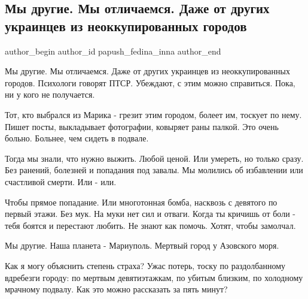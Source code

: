  
 
 
 
 
 
\subsection{Мы другие. Мы отличаемся. Даже от других украинцев из неоккупированных городов}
\label{sec:24_05_2022.fb.papush_fedina_inna.1.my_drugie}
 
\ifcmt
 author_begin
   author_id papush_fedina_inna
 author_end
\fi

Мы другие. Мы отличаемся. Даже от других украинцев из неоккупированных городов.
Психологи говорят ПТСР. Убеждают,  с этим можно справиться. Пока, ни у кого не
получается. 

Тот, кто выбрался из Марика - грезит этим городом, болеет им, тоскует по
нему. Пишет посты, выкладывает фотографии, ковыряет раны палкой. Это очень
больно. Больнее, чем сидеть в подвале. 


Тогда мы знали, что нужно выжить. Любой ценой. Или умереть, но только сразу.
Без ранений, болезней и попадания под завалы. Мы молились об избавлении или
счастливой смерти. Или - или. 

Чтобы прямое попадание. Или многотонная бомба, насквозь с девятого по первый
этажи.  Без мук. На муки нет сил и отваги. Когда ты кричишь от боли -  тебя
боятся и перестают любить. Не знают как помочь. Хотят, чтобы замолчал.


Мы другие. Наша планета -  Мариуполь. Мертвый город у Азовского моря.

Как я могу объяснить степень страха?  Ужас потерь, тоску по раздолбанному
вдребезги городу: по  мертвым девятиэтажкам, по убитым  близким, по холодному
мрачному подвалу. Как это можно рассказать за пять минут? 

